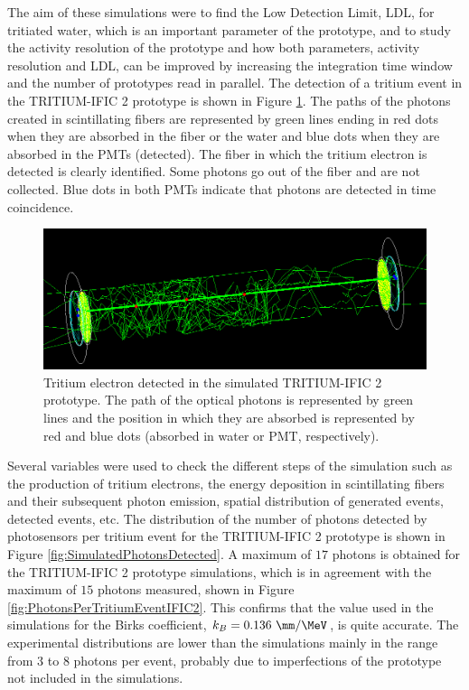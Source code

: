 The aim of these simulations were to find the Low Detection Limit, LDL, for tritiated water, which is an important parameter of the prototype, and to study the activity resolution of the prototype and how both parameters, activity resolution and LDL, can be improved by increasing the integration time window and the number of prototypes read in parallel. The detection of a tritium event in the TRITIUM-IFIC 2 prototype is shown in Figure \ref{fig:TritiumEventDetectedInSimulatedPrototype}. The paths of the photons created in scintillating fibers are represented by green lines ending in red dots when they are absorbed in the fiber or the water and blue dots when they are absorbed in the PMTs (detected). The fiber in which the tritium electron is detected is clearly identified. Some photons go out of the fiber and are not collected. Blue dots in both PMTs indicate that photons are detected in time coincidence.

\begin{figure}[hbtp]
\centering
\includegraphics[scale=0.35]{Figures/8SimulationsResults/82TRITIUMMonitor/821TRITIUMIFIC2/EventDetectedInTRITIUMIFIC2.png}
\caption{Tritium electron detected in the simulated TRITIUM-IFIC 2 prototype. The path of the optical photons is represented by green lines and the position in which they are absorbed is represented by red and blue dots (absorbed in water or PMT, respectively).\label{fig:TritiumEventDetectedInSimulatedPrototype}}
\end{figure}

Several variables were used to check the different steps of the simulation such as the production of tritium electrons, the energy deposition in scintillating fibers and their subsequent photon emission, spatial distribution of generated events, detected events, etc. The distribution of the number of photons detected by photosensors per tritium event for the TRITIUM-IFIC 2 prototype is shown in Figure \ref{fig:SimulatedPhotonsDetected}. A maximum of $17$ photons is obtained for the TRITIUM-IFIC 2 prototype simulations, which is in agreement with the maximum of $15$ photons measured, shown in Figure \ref{fig:PhotonsPerTritiumEventIFIC2}. This confirms that the value used in the simulations for the Birks coefficient, $k_B=0.136~\mm/\MeV$, is quite accurate. The experimental distributions are lower than the simulations mainly in the range from $3$ to $8$ photons per event, probably due to imperfections of the prototype not included in the simulations.

